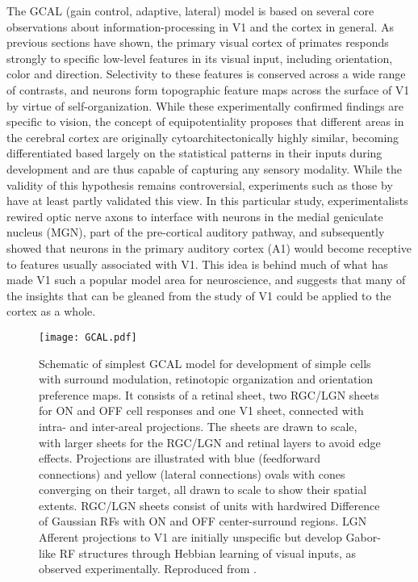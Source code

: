 The GCAL (gain control, adaptive, lateral) model is based on several
core observations about information-processing in V1 and the cortex in
general. As previous sections have shown, the primary visual cortex of
primates responds strongly to specific low-level features in its
visual input, including orientation, color and direction. Selectivity
to these features is conserved across a wide range of contrasts, and
neurons form topographic feature maps across the surface of V1 by
virtue of self-organization. While these experimentally confirmed
findings are specific to vision, the concept of equipotentiality
proposes that different areas in the cerebral cortex are originally
cytoarchitectonically highly similar, becoming differentiated based
largely on the statistical patterns in their inputs during development
and are thus capable of capturing any sensory modality. While the
validity of this hypothesis remains controversial, experiments such as
those by \cite{Sur1990} have at least partly validated this view. In
this particular study, experimentalists rewired optic nerve axons to
interface with neurons in the medial geniculate nucleus (MGN), part of
the pre-cortical auditory pathway, and subsequently showed that
neurons in the primary auditory cortex (A1) would become receptive to
features usually associated with V1. This idea is behind much of what
has made V1 such a popular model area for neuroscience, and suggests
that many of the insights that can be gleaned from the study of V1
could be applied to the cortex as a whole.

\begin{figure}
	\centering \texttt{[image: GCAL.pdf]}
	\caption[Schematic representation of the GCAL model. Reproduced
      from \cite{Stevens2013}.]{Schematic of simplest GCAL model for
      development of simple cells with surround modulation,
      retinotopic organization and orientation preference maps. It
      consists of a retinal sheet, two RGC/LGN sheets for ON and OFF cell
      responses and one V1 sheet, connected with intra- and
      inter-areal projections. The sheets are drawn to scale, with
      larger sheets for the RGC/LGN and retinal layers to avoid edge
      effects. Projections are illustrated with blue (feedforward
      connections) and yellow (lateral connections) ovals with cones
      converging on their target, all drawn to scale to show their
      spatial extents. RGC/LGN sheets consist of units with hardwired
      Difference of Gaussian RFs with ON and OFF center-surround
      regions. LGN Afferent projections to V1 are initially unspecific
      but develop Gabor-like RF structures through Hebbian learning of
      visual inputs, as observed experimentally. Reproduced from
      \cite{Stevens2013}.}
	\label{GCAL}
\end{figure}

